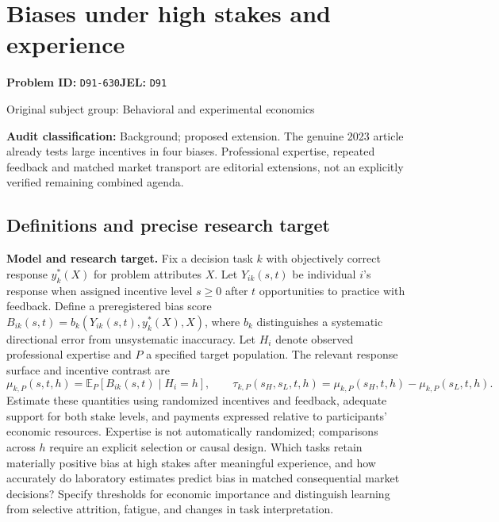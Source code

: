 \documentclass[11pt,a4paper]{article}
\begin{document}
\section*{Biases under high stakes and experience}
\textbf{Problem ID:} \texttt{D91-630}\quad \textbf{JEL:} \texttt{D91}\par
\label{problem:OP-0302}
{\sffamily\small\color{muted}Original subject group: Behavioral and experimental economics\par}
\label{definitions:problem:30007584}
\textbf{Audit classification:} Background; proposed extension. The genuine 2023 article already tests large incentives in four biases. Professional expertise, repeated feedback and matched market transport are editorial extensions, not an explicitly verified remaining combined agenda.
\subsection*{Definitions and precise research target}
\textbf{Model and research target.} Fix a decision task \(k\) with objectively correct response \(y_k^*(X)\) for problem attributes \(X\). Let \(Y_{ik}(s,t)\) be individual \(i\)'s response when assigned incentive level \(s\geq0\) after \(t\) opportunities to practice with feedback. Define a preregistered bias score \(B_{ik}(s,t)=b_k(Y_{ik}(s,t),y_k^*(X),X)\), where \(b_k\) distinguishes a systematic directional error from unsystematic inaccuracy. Let \(H_i\) denote observed professional expertise and \(P\) a specified target population. The relevant response surface and incentive contrast are
\[\mu_{k,P}(s,t,h)=\mathbb E_P[B_{ik}(s,t)\mid H_i=h],\qquad \tau_{k,P}(s_H,s_L,t,h)=\mu_{k,P}(s_H,t,h)-\mu_{k,P}(s_L,t,h).\]
Estimate these quantities using randomized incentives and feedback, adequate support for both stake levels, and payments expressed relative to participants' economic resources. Expertise is not automatically randomized; comparisons across \(h\) require an explicit selection or causal design. Which tasks retain materially positive bias at high stakes after meaningful experience, and how accurately do laboratory estimates predict bias in matched consequential market decisions? Specify thresholds for economic importance and distinguish learning from selective attrition, fatigue, and changes in task interpretation.
\end{document}
